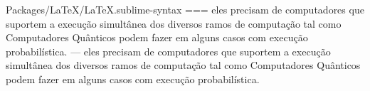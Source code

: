 Packages/LaTeX/LaTeX.sublime-syntax
===
    eles precisam de computadores que suportem a execução simultânea dos
    diversos ramos de computação tal como Computadores Quânticos podem
    fazer em alguns casos com execução probabilística.
---
    eles precisam de computadores que suportem a execução simultânea dos
    diversos ramos de computação tal como Computadores Quânticos podem
    fazer em alguns casos com execução probabilística.
